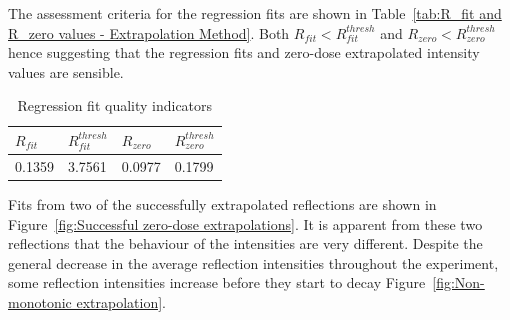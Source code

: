 The assessment criteria for the regression fits are shown in Table~\ref{tab:R_fit and R_zero values - Extrapolation Method}.
Both $R_{fit} < R^{thresh}_{fit}$ and $R_{zero} < R^{thresh}_{zero}$ hence suggesting that the regression fits and zero-dose extrapolated intensity values are sensible.
\begin{table}[ht!]
	\caption{Regression fit quality indicators}
	\centering
	\begin{tabular}{p{1.5cm} | p{1.5cm} | p{1.5cm} | p{1.5cm}}
		$R_{fit}$     & $R^{thresh}_{fit}$    & $R_{zero}$   & $R^{thresh}_{zero}$  \\
		\hline
		0.1359        & 3.7561                & 0.0977       & 0.1799        \\
	\end{tabular}
	\label{tab:R_fit and R_zero values}
\end{table}
Fits from two of the successfully extrapolated reflections are shown in Figure~\ref{fig:Successful zero-dose extrapolations}.
It is apparent from these two reflections that the behaviour of the intensities are very different.
Despite the general decrease in the average reflection intensities throughout the experiment, some reflection intensities increase before they start to decay Figure~\ref{fig:Non-monotonic extrapolation}.
